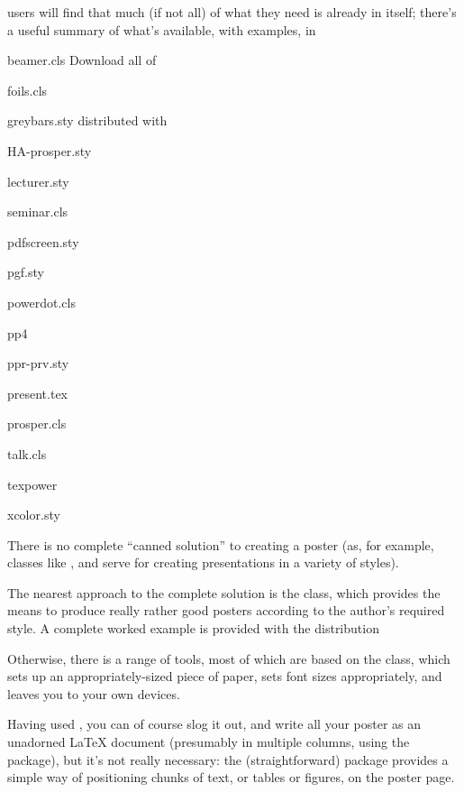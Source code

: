 \CONTeXT{} users will find that much (if not all) of what they need is
already in \CONTeXT{} itself; there's a useful summary of what's
available, with examples, in
% 
\begin{ctanrefs}
\item[beamer.cls]Download all of 
\item[foils.cls]
\item[greybars.sty]distributed with 
\item[HA-prosper.sty]
\item[lecturer.sty]
\item[seminar.cls]
\item[pdfscreen.sty]
\item[pgf.sty]
\item[powerdot.cls]
\item[pp4]
\item[ppr-prv.sty]
\item[present.tex]
\item[prosper.cls]
\item[talk.cls]
\item[texpower]
\item[xcolor.sty]
\end{ctanrefs}


There is no complete ``canned solution'' to creating a poster (as, for
example, classes like ,  and
 serve for creating presentations in a variety of
styles).

The nearest approach to the complete solution is the 
class, which provides the means to produce really rather good posters
according to the author's required style.  A complete worked example
is provided with the distribution

Otherwise, there is a range of tools, most of which are based on the
 class, which sets up an appropriately-sized piece of
paper, sets font sizes appropriately, and leaves you to your own
devices.

Having used , you can of course slog it out, and write
all your poster as an unadorned \LaTeX{} document (presumably in
multiple columns, using the  package), but it's not really
necessary: the (straightforward)  package provides a
simple way of positioning chunks of text, or tables or figures, on the
poster page.

